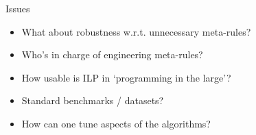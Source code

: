 \documentclass[presentation]{beamer}\mode<presentation>{\usetheme{AMSBolognaFC}}
\begin{document}
\begin{frame}{Issues}
    \begin{itemize}
        \item What about robustness w.r.t. unnecessary meta-rules?
        \item Who's in charge of engineering meta-rules?
        \item How usable is ILP in `programming in the large'?
        \item Standard benchmarks / datasets?
        \item How can one tune aspects of the algorithms?
    \end{itemize}
\end{frame}

\section*{}

\frame{\titlepage}

\section*{\refname}

\begin{frame}{\refname}
    \scriptsize
    \nocite{*}
    
    
\end{frame}

\end{document}
